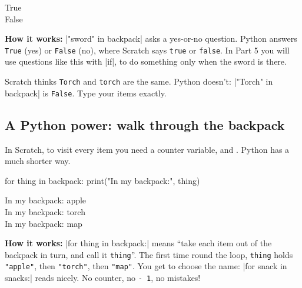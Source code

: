 \begin{outputbox}
True\\
False
\end{outputbox}

\textbf{How it works:} \py|"sword" in backpack| asks a yes-or-no question. Python answers \texttt{True} (yes) or \texttt{False} (no), where Scratch says \texttt{true} or \texttt{false}. In Part 5 you will use questions like this with \py|if|, to do something only when the sword is there.

\begin{watchout}
Scratch thinks \texttt{Torch} and \texttt{torch} are the same. Python doesn't: \py|"Torch" in backpack| is \texttt{False}. Type your items exactly.
\end{watchout}

\subsection*{A Python power: walk through the backpack}

In Scratch, to visit every item you need a counter variable,  and . Python has a much shorter way.

\begin{center}
\begin{scratch}
\end{scratch}
\end{center}
\begin{code}
for thing in backpack:
    print("In my backpack:", thing)
\end{code}

\begin{outputbox}
In my backpack: apple\\
In my backpack: torch\\
In my backpack: map
\end{outputbox}

\textbf{How it works:} \py|for thing in backpack:| means ``take each item out of the backpack in turn, and call it \texttt{thing}''. The first time round the loop, \texttt{thing} holds \texttt{"apple"}, then \texttt{"torch"}, then \texttt{"map"}. You get to choose the name: \py|for snack in snacks:| reads nicely. No counter, no \texttt{- 1}, no mistakes!

